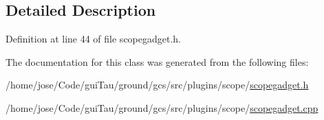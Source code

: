 \subsection{Detailed Description}


Definition at line 44 of file scopegadget.\-h.



The documentation for this class was generated from the following files\-:\begin{DoxyCompactItemize}
\item 
/home/jose/\-Code/gui\-Tau/ground/gcs/src/plugins/scope/\hyperlink{scopegadget_8h}{scopegadget.\-h}\item 
/home/jose/\-Code/gui\-Tau/ground/gcs/src/plugins/scope/\hyperlink{scopegadget_8cpp}{scopegadget.\-cpp}\end{DoxyCompactItemize}
